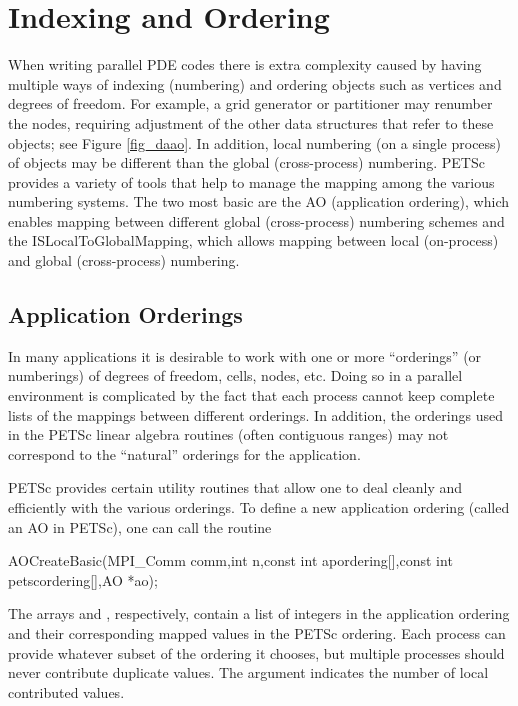 \section{Indexing and Ordering}
\label{sec_indexingandordering}

  When writing parallel PDE codes there is extra complexity caused by
having multiple ways of indexing (numbering) and ordering objects such
as vertices and degrees of freedom. For example, a grid generator
or partitioner may renumber the nodes, requiring adjustment of the
other data structures that refer to these objects; see Figure
\ref{fig_daao}.  In addition, local numbering (on a single process)
of objects may be different than the global (cross-process)
numbering. PETSc provides a variety of tools that help to manage the
mapping among the various numbering systems. The two most basic are
the AO (application ordering), which enables mapping between
different global (cross-process) numbering schemes and the ISLocalToGlobalMapping, which allows mapping between local
(on-process) and global (cross-process) numbering.

\subsection{Application Orderings}
\label{sec_ao}

In many applications it is desirable to work with one or more
``orderings'' (or numberings) of degrees of freedom, cells, nodes,
etc.   Doing so in a parallel environment is
complicated by the fact that each process cannot keep complete lists
of the mappings between different orderings. In addition, the
orderings used in the PETSc linear algebra routines (often contiguous
ranges) may not correspond to the ``natural'' orderings for the application.

PETSc provides certain utility routines that allow one to deal cleanly
and efficiently with the various orderings. To define a new application ordering
(called an AO in PETSc), one can call the routine
\begin{tabbing}
  AOCreateBasic(MPI\_Comm comm,int n,const int apordering[],const int petscordering[],AO *ao);
\end{tabbing}
The
arrays  and , respectively, contain a list of integers
in the application ordering and their corresponding mapped values in the PETSc
ordering. Each process can provide whatever subset of the ordering it
chooses, but multiple processes should never contribute duplicate values.
The argument  indicates the number of local contributed values.

